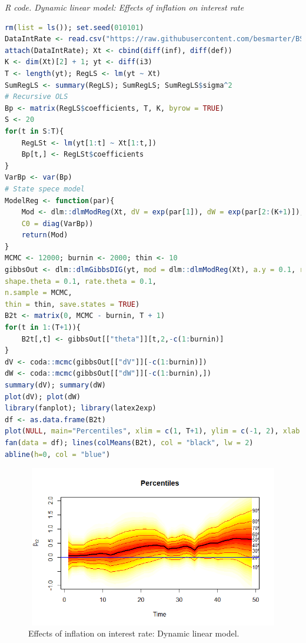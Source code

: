 \begin{tcolorbox}[enhanced,width=4.67in,center upper,
	fontupper=\large\bfseries,drop shadow southwest,sharp corners]
	\textit{R code. Dynamic linear model: Effects of inflation on interest rate}
	\begin{VF}
		\begin{lstlisting}[language=R]
rm(list = ls()); set.seed(010101)
DataIntRate <- read.csv("https://raw.githubusercontent.com/besmarter/BSTApp/refs/heads/master/DataApp/16INTDEF.csv", sep = ",", header = TRUE, quote = "")
attach(DataIntRate); Xt <- cbind(diff(inf), diff(def))
K <- dim(Xt)[2] + 1; yt <- diff(i3)
T <- length(yt); RegLS <- lm(yt ~ Xt)
SumRegLS <- summary(RegLS); SumRegLS; SumRegLS$sigma^2  
# Recursive OLS
Bp <- matrix(RegLS$coefficients, T, K, byrow = TRUE)
S <- 20
for(t in S:T){
	RegLSt <- lm(yt[1:t] ~ Xt[1:t,])
	Bp[t,] <- RegLSt$coefficients 
}
VarBp <- var(Bp)
# State spece model
ModelReg <- function(par){
	Mod <- dlm::dlmModReg(Xt, dV = exp(par[1]), dW = exp(par[2:(K+1)]), m0 = RegLS$coefficients,
	C0 = diag(VarBp))
	return(Mod)
}
MCMC <- 12000; burnin <- 2000; thin <- 10
gibbsOut <- dlm::dlmGibbsDIG(yt, mod = dlm::dlmModReg(Xt), a.y = 0.1, rate.y = 0.1,
shape.theta = 0.1, rate.theta = 0.1,
n.sample = MCMC,
thin = thin, save.states = TRUE)
B2t <- matrix(0, MCMC - burnin, T + 1)
for(t in 1:(T+1)){
	B2t[,t] <- gibbsOut[["theta"]][t,2,-c(1:burnin)] 
}
dV <- coda::mcmc(gibbsOut[["dV"]][-c(1:burnin)])
dW <- coda::mcmc(gibbsOut[["dW"]][-c(1:burnin),])
summary(dV); summary(dW)
plot(dV); plot(dW)
library(fanplot); library(latex2exp)
df <- as.data.frame(B2t)
plot(NULL, main="Percentiles", xlim = c(1, T+1), ylim = c(-1, 2), xlab = "Time", ylab = TeX("$\\beta_{t1}$"))
fan(data = df); lines(colMeans(B2t), col = "black", lw = 2)
abline(h=0, col = "blue")
\end{lstlisting}
	\end{VF}
\end{tcolorbox}

\begin{figure}[!h]
	\includegraphics[width=340pt, height=200pt]{Chapters/chapter8/figures/IntInf.png}
	\caption[List of figure caption goes here]{Effects of inflation on interest rate: Dynamic linear model.}\label{fig2}
\end{figure}


